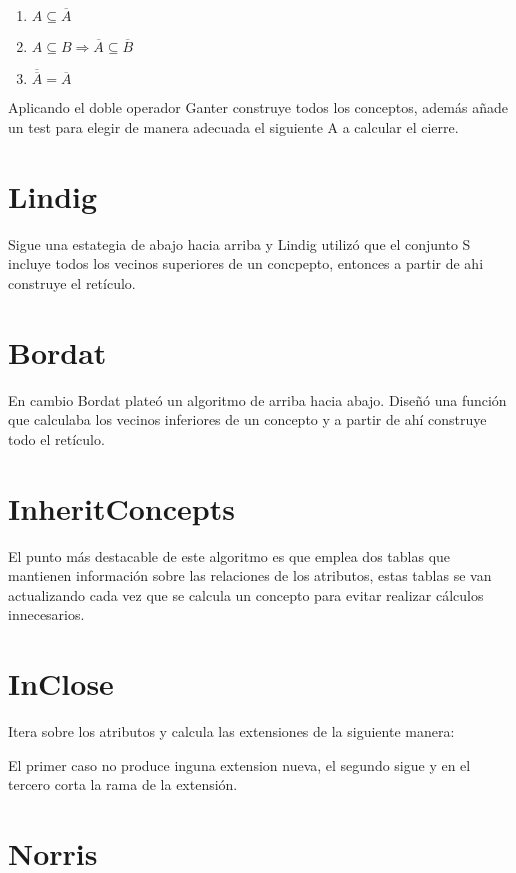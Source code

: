 \documentclass{article}
\begin{document}
\begin{enumerate}
    \item $A \subseteq \overline{A}$
    \item $A \subseteq B \Longrightarrow \overline{A} \subseteq \overline{B}$
    \item $\overline{\overline{A}} = \overline{A}$
\end{enumerate}

Aplicando el doble operador Ganter construye todos los conceptos, además añade un test para elegir de manera adecuada el siguiente A a calcular el cierre.

\section{Lindig}

Sigue una estategia de abajo hacia arriba y Lindig utilizó que el conjunto S incluye todos los vecinos superiores de un concpepto, entonces a partir de ahi construye el retículo.

\section{Bordat}

En cambio Bordat plateó un algoritmo de arriba hacia abajo. Diseñó una función que calculaba los vecinos inferiores de un concepto y a partir de ahí construye todo el retículo.

\section{InheritConcepts}

El punto más destacable de este algoritmo es que emplea dos tablas que mantienen información sobre las relaciones de los atributos, estas tablas se van actualizando cada vez que se calcula un concepto para evitar realizar cálculos innecesarios.

\section{InClose}
Itera sobre los atributos y calcula las extensiones de la siguiente manera:

El primer caso no produce inguna extension nueva, el segundo sigue y en el tercero corta la rama de la extensión.

\section{Norris}
\end{document}
